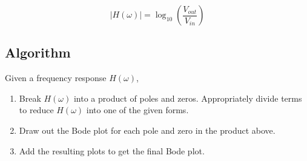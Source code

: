 \[
|H(\omega)|  =  \log_{10}\left({\frac{V_{out}}{V_{in}}}  \right)
\]

\newpage
\subsection{Algorithm}
Given a frequency response $H(\omega)$,
\begin{enumerate}
\item
  Break $H(\omega)$ into a product of poles and zeros.
  Appropriately divide terms to reduce $H(\omega)$ into one of the given forms. 
\item
  Draw out the Bode plot for each pole and zero in the product above.
\item
  Add the resulting plots to get the final Bode plot.
\end{enumerate}

